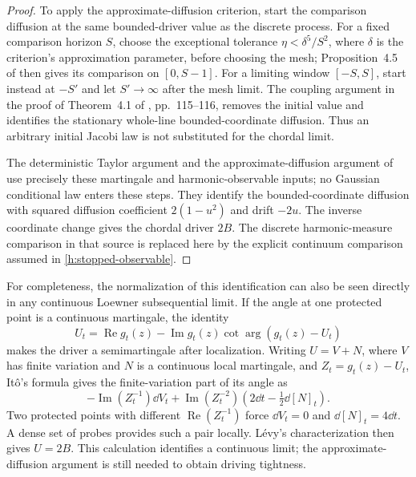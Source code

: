 \begin{proof}
To apply the approximate-diffusion criterion, start the comparison
diffusion at the same bounded-driver value as the discrete process.
For a fixed comparison horizon $S$, choose the exceptional tolerance
$\eta<\delta^5/S^2$, where $\delta$ is the criterion's approximation
parameter, before choosing the mesh; Proposition~4.5 of
\cite{SSdiscrete} then gives its comparison on $[0,S-1]$.
For a limiting window $[-S,S]$, start instead at $-S'$ and let
$S'\to\infty$ after the mesh limit. The coupling argument in the
proof of Theorem~4.1 of \cite{SSdiscrete}, pp.~115--116, removes the
initial value and identifies the stationary whole-line
bounded-coordinate diffusion. Thus an arbitrary initial Jacobi law
is not substituted for the chordal limit.

The deterministic Taylor argument and the approximate-diffusion
argument of \cite[Propositions 4.2 and 4.5]{SSdiscrete} use precisely
these martingale and harmonic-observable inputs; no Gaussian
conditional law enters these steps. They identify the bounded-coordinate
diffusion with squared diffusion coefficient $2(1-u^2)$ and drift
$-2u$. The inverse coordinate change \cite[Section~4.6]{SSdiscrete} gives
the chordal driver $2B$.
The discrete harmonic-measure comparison in that source is replaced
here by the explicit continuum comparison assumed in
\eqref{h:stopped-observable}.
\end{proof}

For completeness, the normalization of this identification can also be
seen directly in any continuous Loewner subsequential limit. If the
angle at one protected point is a continuous martingale, the identity
\[
 U_t=\operatorname{Re}g_t(z)-
       \operatorname{Im}g_t(z)\cot\arg(g_t(z)-U_t)
\]
makes the driver a semimartingale after localization. Writing
$U=V+N$, where $V$ has finite variation and $N$ is a continuous local
martingale, and $Z_t=g_t(z)-U_t$, It\^o's formula gives the finite-variation
part of its angle as
\[
 -\operatorname{Im}(Z_t^{-1})\dd V_t+
 \operatorname{Im}(Z_t^{-2})
       \left(2\dd t-\tfrac12\dd[N]_t\right).
\]
Two protected points with different
$\operatorname{Re}(Z_t^{-1})$ force $\dd V_t=0$ and
$\dd[N]_t=4\dd t$. A dense set of probes provides such a pair locally.
L\'evy's characterization then gives $U=2B$.
This calculation identifies a continuous limit; the
approximate-diffusion argument is still needed to obtain driving
tightness.

